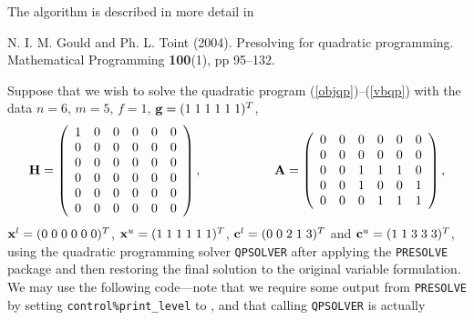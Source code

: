 \documentclass{galahad}
\newcommand{\packagename}{PRESOLVE}
\newcommand{\sym}{\tt\small}
\begin{document}
\vspace*{1mm}

\galreferences
\vspace*{1mm}

\noindent
The algorithm is described in more detail in
\vspace*{1mm}

\noindent
N. I. M. Gould and Ph. L. Toint (2004).
Presolving for quadratic programming.
Mathematical Programming {\bf 100}(1), pp 95--132.
\vspace*{1mm}



\galexample
Suppose that we wish to solve the quadratic program
(\ref{objqp})--(\ref{vbqp}) with the data $n = 6$, $m = 5$, $f = 1$,
${\mathbf{g}} = ( 1 \; 1 \; 1 \; 1 \; 1 \; 1)^T$,
\[
{\mathbf{H}} =\left(\begin{array}{cccccc}
        1 & 0 & 0 & 0 & 0 & 0 \\
        0 & 0 & 0 & 0 & 0 & 0 \\
        0 & 0 & 0 & 0 & 0 & 0 \\
        0 & 0 & 0 & 0 & 0 & 0 \\
        0 & 0 & 0 & 0 & 0 & 0 \\
        0 & 0 & 0 & 0 & 0 & 0 \\
        \end{array}\right),
\hspace*{2cm}
{\mathbf{A}} = \left(\begin{array}{cccccc}
        0 & 0 & 0 & 0 & 0 & 0 \\
        0 & 0 & 0 & 0 & 0 & 0 \\
        0 & 0 & 1 & 1 & 1 & 0 \\
        0 & 0 & 1 & 0 & 0 & 1 \\
        0 & 0 & 0 & 1 & 1 & 1 \\
        \end{array}\right),
\]
${\mathbf{x}}^l = ( 0\; 0\; 0\; 0\; 0\; 0 )^T$,
${\mathbf{x}}^u = ( 1 \; 1 \; 1 \; 1 \; 1 \; 1 )^T$,
${\mathbf{c}}^l = ( 0 \; 0 \; 2 \; 1 \; 3 )^T$ and
${\mathbf{c}}^u = ( 1 \; 1 \; 3 \; 3 \; 3 )^T$,
using the quadratic programming solver {\tt QPSOLVER} after applying
the {\tt \packagename} package and then restoring the final solution to the
original
variable formulation. We may use the following code---note that we require
some output from {\tt \packagename} by setting {\tt control\%print\_level} to
{\sym \galsymtrace}, and that calling {\tt QPSOLVER} is actually
\end{document}
